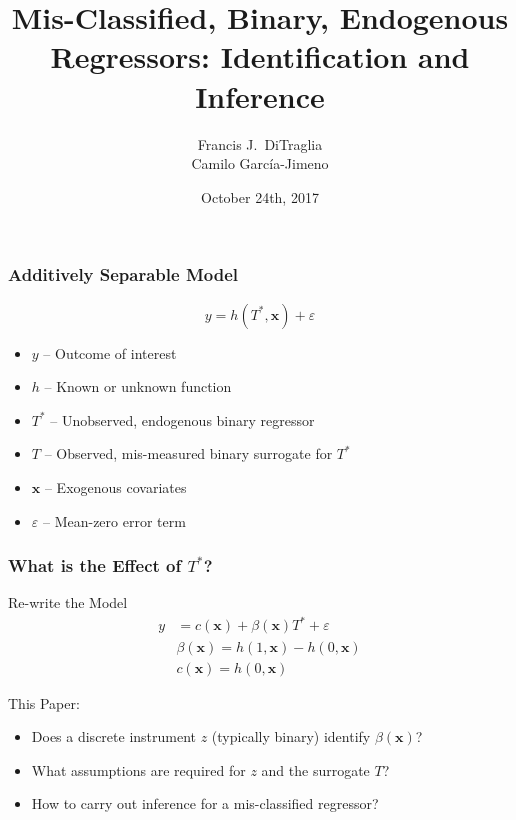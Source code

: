 \documentclass{beamer}
\title[Binary Regressors]{Mis-Classified, Binary, Endogenous Regressors: Identification and Inference}
\author[FJ DiTraglia]{Francis J.\ DiTraglia\\ Camilo Garc\'{i}a-Jimeno}
\institute{University of Pennsylvania}
\date{October 24th, 2017}
\begin{document}
 

\begin{frame}[plain]
	\titlepage 
\end{frame} 
\begin{frame}
  \frametitle{Additively Separable Model}
\[
  y = h(T^*, \mathbf{x}) + \varepsilon
\]
\vspace{-1em}
    \begin{itemize}    
    \item $y$ -- Outcome of interest
    \item $h$ -- Known or unknown function 
    \item $T^*$ -- Unobserved, endogenous binary regressor
    \item $T$ -- Observed, mis-measured binary surrogate for $T^*$
    \item $\mathbf{x}$ -- Exogenous covariates
    \item $\varepsilon$ -- Mean-zero error term
  \end{itemize}

\end{frame}
\begin{frame}
  \frametitle{What is the Effect of $T^*$?}
 
  \begin{block}{Re-write the Model}
\begin{align*}
  y &= c(\mathbf{x}) + \beta(\mathbf{x}) T^* + \varepsilon\\
  &\beta(\mathbf{x}) = h(1,\mathbf{x}) - h(0,\mathbf{x})\\
  &c(\mathbf{x}) = h(0,\mathbf{x})
\end{align*}
  \end{block}

  \begin{alertblock}{This Paper:}
    \begin{itemize}
      \item Does a discrete instrument $z$ (typically binary) identify $\beta(\mathbf{x})$? 
      \item What assumptions are required for $z$ and the surrogate $T$?
      \item How to carry out inference for a mis-classified regressor?
    \end{itemize}
  \end{alertblock}
\end{frame}
\end{document}
